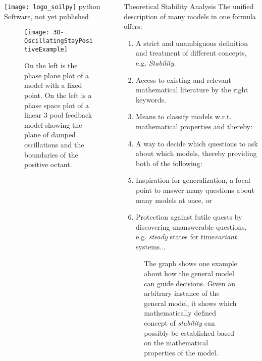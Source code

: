 \documentclass[final,hyperref={pdfpagelabels=false}, professionalmath, mathserif, 11pt]{beamer}
\begin{document}
\begin{frame}
\begin{columns}
\begin{column}{.48\textwidth}
\begin{minipage}[T]{.95\textwidth}
\begin{block}{
	  \texttt{[image: logo\_soilpy]} 
	  \hspace{1cm}
	  python Software, not yet published 
	  }
\begin{figure}
	  \texttt{[image: 3D-OscillatingStayPositiveExample]}
	  \caption{On the left is the phase plane plot of a model with a fixed point. On the left is a phase space plot of a linear 3 pool feedback model showing the plane of damped  oscillations and the boundaries of the positive octant.
	  }
	\end{figure}
      \end{block}
    \end{minipage}
  \end{column}
  
  
  
  \begin{column}{.48\textwidth}
    \begin{minipage}[T]{.95\textwidth}
      \begin{block}{Theoretical Stability Analysis}
      The unified description of many models in one formula offers: 
      \begin{enumerate}
	\item 
	A strict and unambiguous definition and  treatment of different concepts, e.g. \emph{Stability}. 
	\item
	Access to existing and relevant mathematical literature by the right keywords. 
	\item 
	Means to classify models w.r.t. mathematical properties and thereby:
	\item 
	A way to decide which questions to ask about which models, thereby providing both of the following: 
	\item 
	Inspiration for generalization, a focal point to answer many questions about many models at once, or
	\item 
	Protection against futile quests by discovering unanswerable questions, e.g. \emph{steady} states for time\emph{variant} systems... 
      \end{enumerate}
	\begin{figure}
	
	    
	  \caption{The graph shows one example about how the general model can guide decisions. Given an arbitrary instance of the general model, it  shows which  mathematically defined concept of \emph{stability} can possibly be established based on the mathematical properties of the model.}

\end{figure}
\end{block}
\end{minipage}
\end{column}
\end{columns}
\end{frame}
\end{document}
